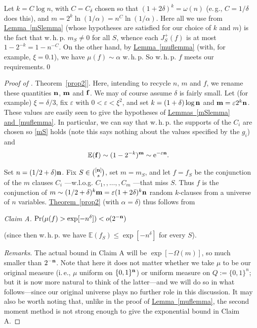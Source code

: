 \documentclass[11pt]{article}
\numberwithin{equation}{section}
\theoremstyle{definition}
\theoremstyle{plain}
\newcommand{\eee}{\mathrm e}
\newcommand{\ie}{i.\,e.}
\newcommand{\eg}{e.\,g.}
\newcommand{\expref}[2]{\hyperref[#2]{#1~\ref{#2}}}
\newcommand{\nn}[0]{{\bf n}}
\newcommand{\mm}[0]{{\bf m}}
\newcommand{\beq}[1]{\begin{equation}\label{#1}}
\newcommand{\enq}[0]{\end{equation}}
\newcommand{\mn}[0]{\medskip\noindent}
\renewcommand{\dots}[0]{,\ldots,}
\newcommand{\ff}[0]{{\bf f}}
\newcommand{\0}[0]{\emptyset}
\newcommand{\ga}[0]{\alpha }
\newcommand{\gd}[0]{\delta }
\newcommand{\go}[0]{\omega}
\newcommand{\gO}[0]{\Omega}
\newcommand{\eps}[0]{\varepsilon }
\begin{document}
Let $k=C\log n$, with $C=C_\gd$ chosen so that
$(1+2\gd)^k=\go(n)$ (\eg, $C=1/\gd$ does this),
and
$m = 2^k \ln (1/\ga)=n^C\ln (1/\ga)$.
Here all we use from \expref{Lemma}{mSlemma}
(whose hypotheses are satisfied for our choice of $k$ and $m$)
is the fact that
w.\,h.\,p. $m_S\neq 0$ for all $S$,
whence each $J_S^+(f)$ is at most
$1-2^{-k}=1-n^{-C}$.
On the other hand, by \expref{Lemma}{muflemma}
(with, for example, $\xi=0.1$), we have
$\mu(f) \sim \ga$ w.\,h.\,p.
So w.\,h.\,p. $f$ meets our requirements.\qed


\mn
%
%
\begin{proof}[Proof of \expref{Theorem}{prop2}].   %
Here, intending to recycle $n$, $m$ and $f$, we rename
these quantities
$\nn$, $\mm$ and $\ff$.
We may of course assume $\gd$ is fairly small.
Let (for example) $\xi = \gd/3$, fix $\eps$ with
$0<\eps < \xi^2$, and set
$k=(1+\gd)\log \nn$ and $\mm = \eps 2^k \nn$.
These values are easily seen to give the hypotheses of
\expref{Lemmas}{mSlemma} \expref{and}{muflemma}.
In particular, we can say that w.\,h.\,p.
the supports of the %
$C_i$  %
are chosen so \eqref{mS} holds
(note this says nothing about the values specified by
%
the $g_i$) %
and
\beq{mS'}
\mathbb E (\ff)\sim (1-2^{-k})^\mm\sim \eee^{-\eps \nn}.
\enq




Set $n=(1/2+\gd) \nn$.
Fix %
$S\in \binom{[\nn]}{s}$, %
set $m=m_S$,
and
let $f=f_S$ be the %
conjunction  %
of the $m$ %
clauses $C_i$%
---w.l.o.g. %
$C_1,\dots, C_m$%
---that miss $S$.
Thus $f$ is the %
conjunction of %
$m\sim (1/2+\gd)^k\mm =\eps (1+2\gd)^k\nn$
random $k$-clauses from a universe of $n$ variables.
\expref{Theorem}{prop2} (with $\ga=\gd$) thus follows from

\mn
\emph{Claim A.}
$\Pr(\mu(f)  > \exp[-n^{\gd}]) < o(2^{-\nn})$

\mn
(since then w.\,h.\,p. we have $\mathbb E (f_S)\leq \exp[-n^{\gd}]$ for every $S$).


\mn
\emph{Remarks.}
The actual bound in Claim A will be
$\exp[-\gO(m)]$,
so much smaller than $2^{-\nn}$.
Note that here it %
does not %
matter whether we take $\mu$ to be
our original measure (\ie, $\mu$ uniform on $\{0,1\}^\nn$)
or uniform measure on $Q:=\{0,1\}^n$;
but it is %
now more natural to think of
the latter---and we will do so in what follows---since
our original universe plays no further role in this discussion.
It may also be worth noting that, unlike in the proof of
\expref{Lemma}{muflemma}, the second moment method is not strong
enough to give the exponential bound in Claim A.





\end{proof}
\end{document}
